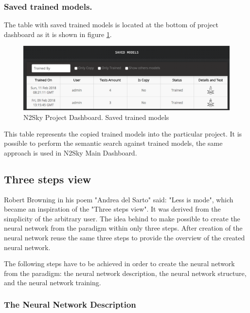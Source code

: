 \begin{itemize}
\subsubsection{Saved trained models.}

The table with saved trained models is located at the bottom of project dashboard as it is shown in figure \ref{fig:saved_trained_models_project}.

\begin{figure}[htbp]
\begin{center}
  \includegraphics[width=\linewidth]{components/5/img/saved_trained_models_project.png}
  \caption{N2Sky Project Dashboard. Saved trained models}
  \label{fig:saved_trained_models_project}
\end{center}
\end{figure}

This table represents the copied trained models into the particular project. It is possible to perform the semantic search against trained models, the same approach is used in N2Sky Main Dashboard. 

\end{itemize}


\subsection{Three steps view}\label{Three steps view}

Robert Browning in his poem "Andrea del Sarto" said: "Less is mode", which became an inspiration of the "Three steps view". It was derived from the simplicity of the arbitrary user. The idea behind to make possible to create the neural network from the paradigm within only three steps. After creation of the neural network reuse the same three steps to provide the overview of the created neural network.

The following steps have to be achieved in order to create the neural network from the paradigm:  the neural network description, the neural network structure, and the neural network training.

\subsubsection{The Neural Network Description}

